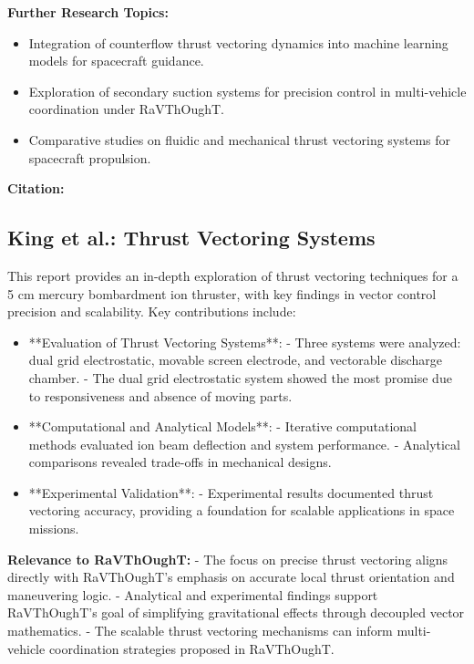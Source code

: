 \textbf{Further Research Topics:}
\begin{itemize}
  \item Integration of counterflow thrust vectoring dynamics into machine learning models for spacecraft guidance.
  \item Exploration of secondary suction systems for precision control in multi-vehicle coordination under RaVThOughT.
  \item Comparative studies on fluidic and mechanical thrust vectoring systems for spacecraft propulsion.
\end{itemize}

\textbf{Citation:} 

\subsection{King et al.: Thrust Vectoring Systems}

This report provides an in-depth exploration of thrust vectoring techniques for a 5 cm mercury bombardment ion thruster, with key findings in vector control precision and scalability. Key contributions include:

\begin{itemize}
  \item **Evaluation of Thrust Vectoring Systems**:
  - Three systems were analyzed: dual grid electrostatic, movable screen electrode, and vectorable discharge chamber.
  - The dual grid electrostatic system showed the most promise due to responsiveness and absence of moving parts.

  \item **Computational and Analytical Models**:
  - Iterative computational methods evaluated ion beam deflection and system performance.
  - Analytical comparisons revealed trade-offs in mechanical designs.

  \item **Experimental Validation**:
  - Experimental results documented thrust vectoring accuracy, providing a foundation for scalable applications in space missions.
\end{itemize}

\textbf{Relevance to RaVThOughT:}
- The focus on precise thrust vectoring aligns directly with RaVThOughT’s emphasis on accurate local thrust orientation and maneuvering logic.
- Analytical and experimental findings support RaVThOughT’s goal of simplifying gravitational effects through decoupled vector mathematics.
- The scalable thrust vectoring mechanisms can inform multi-vehicle coordination strategies proposed in RaVThOughT.

